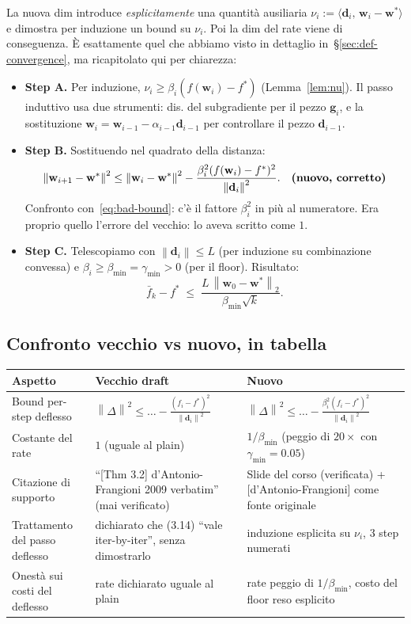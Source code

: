 \documentclass[11pt,a4paper]{article}
\newcommand{\norm}[1]{\left\|#1\right\|}
\newcommand{\inner}[2]{\langle #1,\,#2\rangle}
\newcommand{\bw}{\mathbf{w}}
\newcommand{\bg}{\mathbf{g}}
\newcommand{\bd}{\mathbf{d}}
\theoremstyle{definition}
\begin{document}
La nuova dim introduce \emph{esplicitamente} una quantità ausiliaria $\nu_i := \inner{\bd_i}{\bw_i - \bw^*}$ e dimostra per induzione un bound su $\nu_i$. Poi la dim del rate viene di conseguenza. È esattamente quel che abbiamo visto in dettaglio in~\S\ref{sec:def-convergence}, ma ricapitolato qui per chiarezza:

\begin{itemize}[leftmargin=*]
\item \textbf{Step A.} Per induzione, $\nu_i \ge \beta_i(f(\bw_i)-f^*)$ (Lemma~\ref{lem:nu}). Il passo induttivo usa due strumenti: dis. del subgradiente per il pezzo $\bg_i$, e la sostituzione $\bw_i = \bw_{i-1} - \alpha_{i-1}\bd_{i-1}$ per controllare il pezzo $\bd_{i-1}$.
\item \textbf{Step B.} Sostituendo nel quadrato della distanza:
\begin{equation}
\label{eq:def-perstep-errata}
\norm{\bw_{i+1}-\bw^*}^2 \le \norm{\bw_i-\bw^*}^2 - \frac{\beta_i^2(f(\bw_i)-f^*)^2}{\norm{\bd_i}^2}. \quad\text{\textbf{(nuovo, corretto)}}
\end{equation}
Confronto con~\eqref{eq:bad-bound}: c'è il fattore $\beta_i^2$ in più al numeratore. Era proprio quello l'errore del vecchio: lo aveva scritto come $1$.
\item \textbf{Step C.} Telescopiamo con $\norm{\bd_i}\le L$ (per induzione su combinazione convessa) e $\beta_i\ge\beta_{\min}=\gamma_{\min}>0$ (per il floor). Risultato:
\[
\bar f_k - f^* \;\le\; \frac{L\,\norm{\bw_0-\bw^*}_2}{\beta_{\min}\sqrt k}.
\]
\end{itemize}

\subsection{Confronto vecchio vs nuovo, in tabella}

\begin{center}\small
\begin{tabular}{p{4cm}p{5cm}p{5cm}}
\toprule
\textbf{Aspetto} & \textbf{Vecchio draft} & \textbf{Nuovo} \\
\midrule
Bound per-step deflesso & $\norm{\Delta}^2 \le \dots - \frac{(f_i-f^*)^2}{\norm{\bd_i}^2}$ & $\norm{\Delta}^2 \le \dots - \frac{\beta_i^2(f_i-f^*)^2}{\norm{\bd_i}^2}$ \\[0.4em]
Costante del rate & $1$ (uguale al plain) & $1/\beta_{\min}$ (peggio di $20\times$ con $\gamma_{\min}=0.05$) \\[0.4em]
Citazione di supporto & ``[Thm 3.2] d'Antonio-Frangioni 2009 verbatim'' (mai verificato) & Slide del corso (verificata) + [d'Antonio-Frangioni] come fonte originale \\[0.4em]
Trattamento del passo deflesso & dichiarato che (3.14) ``vale iter-by-iter'', senza dimostrarlo & induzione esplicita su $\nu_i$, 3 step numerati \\[0.4em]
Onestà sui costi del deflesso & rate dichiarato uguale al plain & rate peggio di $1/\beta_{\min}$, costo del floor reso esplicito \\
\bottomrule
\end{tabular}
\end{center}
\end{document}
